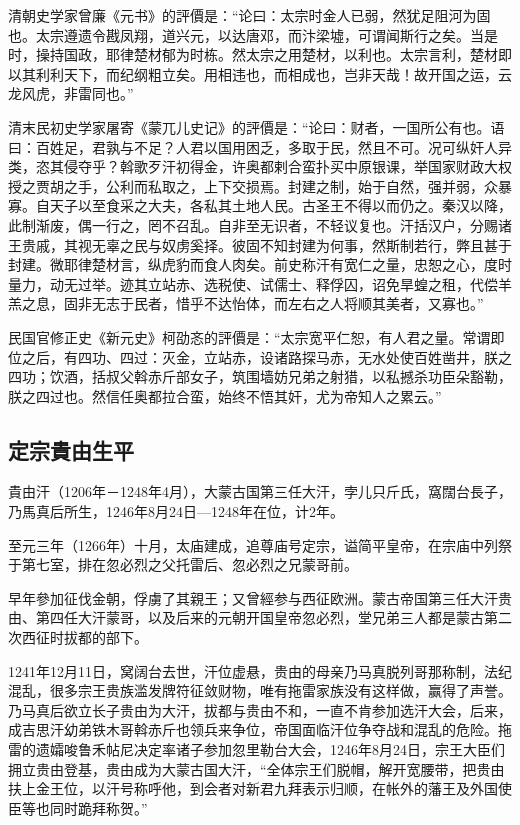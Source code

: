 清朝史学家曾廉《元书》的評價是：“论曰：太宗时金人已弱，然犹足阻河为固也。太宗遵遗令戡凤翔，道兴元，以达唐邓，而汴梁墟，可谓闻斯行之矣。当是时，操持国政，耶律楚材郁为时栋。然太宗之用楚材，以利也。太宗言利，楚材即以其利利天下，而纪纲粗立矣。用相违也，而相成也，岂非天哉！故开国之运，云龙风虎，非雷同也。”

清末民初史学家屠寄《蒙兀儿史记》的評價是：“论曰：财者，一国所公有也。语曰：百姓足，君孰与不足？人君以国用困乏，多取于民，然且不可。况可纵奸人异类，恣其侵夺乎？斡歌歹汗初得金，许奥都剌合蛮扑买中原银课，举国家财政大权授之贾胡之手，公利而私取之，上下交损焉。封建之制，始于自然，强并弱，众暴寡。自天子以至食采之大夫，各私其土地人民。古圣王不得以而仍之。秦汉以降，此制渐废，偶一行之，罔不召乱。自非至无识者，不轻议复也。汗括汉户，分赐诸王贵戚，其视无辜之民与奴虏奚择。彼固不知封建为何事，然斯制若行，弊且甚于封建。微耶律楚材言，纵虎豹而食人肉矣。前史称汗有宽仁之量，忠恕之心，度时量力，动无过举。迹其立站赤、选税使、试儒士、释俘囚，诏免旱蝗之租，代偿羊羔之息，固非无志于民者，惜乎不达怡体，而左右之人将顺其美者，又寡也。”

民国官修正史《新元史》柯劭忞的評價是：“太宗宽平仁恕，有人君之量。常谓即位之后，有四功、四过：灭金，立站赤，设诸路探马赤，无水处使百姓凿井，朕之四功；饮酒，括叔父斡赤斤部女子，筑围墙妨兄弟之射猎，以私撼杀功臣朵豁勒，朕之四过也。然信任奥都拉合蛮，始终不悟其奸，尤为帝知人之累云。”

\subsection{定宗貴由生平}

貴由汗（1206年－1248年4月），大蒙古国第三任大汗，孛儿只斤氏，窩闊台長子，乃馬真后所生，1246年8月24日—1248年在位，计2年。

至元三年（1266年）十月，太庙建成，追尊庙号定宗，谥简平皇帝，在宗庙中列祭于第七室，排在忽必烈之父托雷后、忽必烈之兄蒙哥前。

早年參加征伐金朝，俘虜了其親王；又曾經参与西征欧洲。蒙古帝国第三任大汗贵由、第四任大汗蒙哥，以及后来的元朝开国皇帝忽必烈，堂兄弟三人都是蒙古第二次西征时拔都的部下。

1241年12月11日，窝阔台去世，汗位虚悬，贵由的母亲乃马真脱列哥那称制，法纪混乱，很多宗王贵族滥发牌符征敛财物，唯有拖雷家族没有这样做，赢得了声誉。乃马真后欲立长子贵由为大汗，拔都与贵由不和，一直不肯参加选汗大会，后来，成吉思汗幼弟铁木哥斡赤斤也领兵来争位，帝国面临汗位争夺战和混乱的危险。拖雷的遗孀唆鲁禾帖尼决定率诸子参加忽里勒台大会，1246年8月24日，宗王大臣们拥立贵由登基，贵由成为大蒙古国大汗，“全体宗王们脱帽，解开宽腰带，把贵由扶上金王位，以汗号称呼他，到会者对新君九拜表示归顺，在帐外的藩王及外国使臣等也同时跪拜称贺。”

